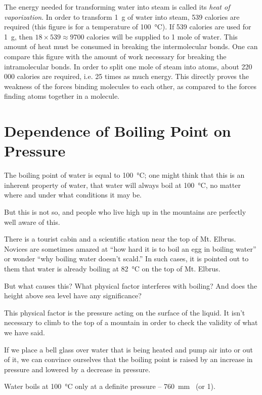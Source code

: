 The energy needed for transforming water into steam is called its \emph{heat of vaporization}. In order to transform \SI{1}{\gram} of water into steam, 539 calories are required (this figure is for a temperature of \SI{100}{\celsius}). If 539 calories are used for \SI{1}{\gram}, then $18 \times 539 \approx 9700$ calories will be supplied to 1 mole of water. This amount of heat must be consumed in breaking the intermolecular bonds. One can compare this figure with the amount of work necessary for breaking the intramolecular bonds. In order to split one mole of steam into atoms, about 220 000 calories are required, i.e. 25 times as much energy. This directly proves the weakness of the forces binding molecules to each other, as compared to the forces finding atoms together in a mole­cule.

\section{Dependence of Boiling Point on Pressure}
The boiling point of water is equal to \SI{100}{\celsius}; one might think that this is an inherent property of water, that water will always boil at \SI{100}{\celsius}, no matter where and under what conditions it may be.

But this is not so, and people who live high up in the mountains are perfectly well aware of this.

There is a tourist cabin and a scientific station near the top of Mt. Elbrus. Novices are sometimes amazed at ``how hard it is to boil an egg in boiling water'' or wonder ``why boiling water doesn’t scald.'' In such cases, it is pointed out to them that water is already boiling at \SI{82}{\celsius} on the top of Mt. Elbrus.

But what causes this? What physical factor interferes with boiling? And does the height above sea level have any significance?

This physical factor is the pressure acting on the surface of the liquid. It isn’t necessary to climb to the top of a mountain in order to check the validity of what we have said.

If we place a bell glass over water that is being heated and pump air into or out of it, we can convince ourselves that the boiling point is raised by an increase in pressure and lowered by a decrease in pressure.

Water boils at \SI{100}{\celsius} only at a definite pressure -- \SI{760}{\milli\meter\mercury} (or \SI{1}{\atmos}).

